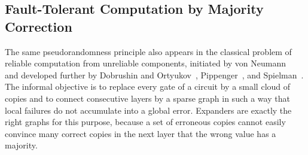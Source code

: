 \subsection{Fault-Tolerant Computation by Majority Correction}
\label{subsec:fault-tolerant-computation}

The same pseudorandomness principle also appears in the classical problem of reliable computation from unreliable components, initiated by von Neumann~\cite{vNeu1956} and developed further by Dobrushin and Ortyukov~\cite{DO1977}, Pippenger~\cite{FOCS:Pippenger85}, and Spielman~\cite{FOCS:Spielman96}. The informal objective is to replace every gate of a circuit by a small cloud of copies and to connect consecutive layers by a sparse graph in such a way that local failures do not accumulate into a global error. Expanders are exactly the right graphs for this purpose, because a set of erroneous copies cannot easily convince many correct copies in the next layer that the wrong value has a majority.


